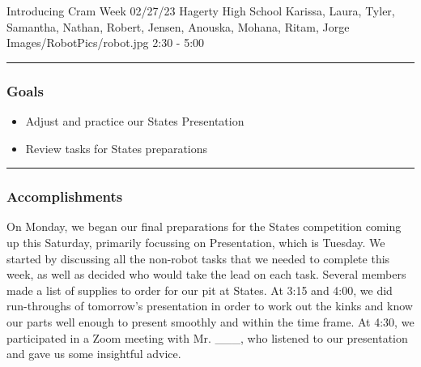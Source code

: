 \insertmeeting 
	{Introducing Cram Week} 
	{02/27/23} 
	{Hagerty High School}
	{Karissa, Laura, Tyler, Samantha, Nathan, Robert, Jensen, Anouska, Mohana, Ritam, Jorge}
	{Images/RobotPics/robot.jpg}
	{2:30 - 5:00}
	
\noindent\hfil\rule{\textwidth}{.4pt}\hfil
\subsubsection*{Goals}
\begin{itemize}
    \item Adjust and practice our States Presentation
    \item Review tasks for States preparations
\end{itemize} 

\noindent\hfil\rule{\textwidth}{.4pt}\hfil

\subsubsection*{Accomplishments}
On Monday, we began our final preparations for the States competition coming up this Saturday, primarily focussing on Presentation, which is Tuesday. We started by discussing all the non-robot tasks that we needed to complete this week, as well as decided who would take the lead on each task. Several members made a list of supplies to order for our pit at States. At 3:15 and 4:00, we did run-throughs of tomorrow’s presentation in order to work out the kinks and know our parts well enough to present smoothly and within the time frame. At 4:30, we participated in a Zoom meeting with Mr. ___, who listened to our presentation and gave us some insightful advice.

 


